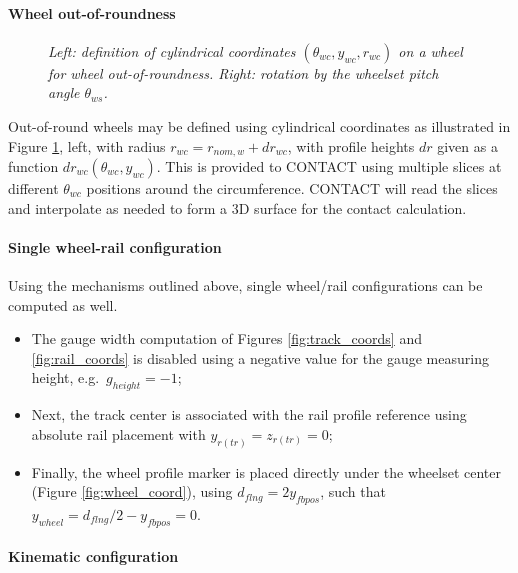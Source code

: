 \documentclass[12pt]{report}
\begin{document}
\paragraph{Wheel out-of-roundness}

\begin{figure}[bt]
\centering
{}
\hspace{10mm}
\caption{\em Left: definition of cylindrical coordinates $(\theta_{wc},
        y_{wc},r_{wc})$ on a wheel for wheel out-of-roundness. Right:
        rotation by the wheelset pitch angle $\theta_{ws}$.}
\label{fig:wheel_theta}
\end{figure}

Out-of-round wheels may be defined using cylindrical coordinates as
illustrated in Figure \ref{fig:wheel_theta}, left, with radius
$r_{wc}=r_{nom,w}+dr_{wc}$, with profile heights $dr$ given as a function
$dr_{wc}(\theta_{wc},y_{wc})$. This is provided to
CONTACT using multiple slices at different $\theta_{wc}$ positions
around the circumference. CONTACT will read the slices and interpolate
as needed to form a 3D surface for the contact calculation.

\paragraph{Single wheel-rail configuration}

Using the mechanisms outlined above, single wheel/rail configurations can
be computed as well.
\begin{itemize}
\item The gauge width computation of Figures \ref{fig:track_coords} and
        \ref{fig:rail_coords} is disabled using a negative value for the
        gauge measuring height, e.g.\ $g_{height}=-1$;
\item Next, the track center is associated with the rail profile reference
        using absolute rail placement with $y_{r(tr)}=z_{r(tr)}=0$;
\item Finally, the wheel profile marker is placed directly under the
        wheelset center (Figure \ref{fig:wheel_coord}), using
        $d_{flng}=2 y_{fbpos}$, such that $y_{wheel}=d_{flng}/2-y_{fbpos}=0$.
\end{itemize}

\paragraph{Kinematic configuration}
\end{document}
